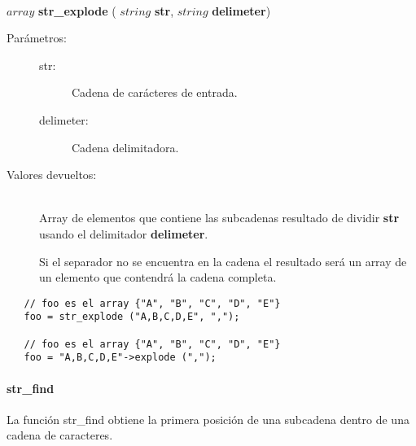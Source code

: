 \begin{framed}
\hfill \\ $array$ \textbf{str\_explode} ( $string$ \textbf{str}, $string$ \textbf{delimeter})  
\begin{description}
\item [Parámetros:] \hfill 
   \begin{description}
   \item[str:] Cadena de carácteres de entrada.
   \item[delimeter:] Cadena delimitadora.
   \end{description}
\item[Valores devueltos:] \hfill \\
   Array de elementos que contiene las subcadenas resultado de dividir \textbf{str} usando el delimitador \textbf{delimeter}.
   
   Si el separador no se encuentra en la cadena el resultado será un array de un elemento que contendrá la cadena completa.
\end{description}
\end{framed}


\begin{lstlisting}
   // foo es el array {"A", "B", "C", "D", "E"}
   foo = str_explode ("A,B,C,D,E", ","); 
   
   // foo es el array {"A", "B", "C", "D", "E"}
   foo = "A,B,C,D,E"->explode (",");
\end{lstlisting}

\paragraph {str\_find}
La función str\_find obtiene la primera posición de una subcadena dentro de una cadena de caracteres. 


